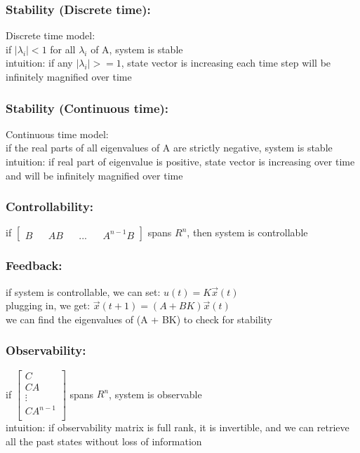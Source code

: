 \documentclass{beamer}
\begin{document}
\begin{frame}
\frametitle{Stability (Discrete time):}

Discrete time model: \\
if $|\lambda_{i}| < 1$ for all $\lambda_{i}$ of A, system is stable\\
intuition: if any $|\lambda_{i}| >= 1$, state vector is increasing each time step will be infinitely magnified over time \\
\end{frame}

\begin{frame}
\frametitle{Stability (Continuous time):}

Continuous time model: \\
if the real parts of all eigenvalues of A are strictly negative, system is stable\\
intuition: if real part of eigenvalue is positive, state vector is increasing over time and will be infinitely magnified over time \\
\end{frame}

\begin{frame}
\frametitle{Controllability:}

if
$\begin{bmatrix}
B && AB && ... && A^{n-1}B
\end{bmatrix}$
spans $R^{n}$, then system is controllable 
\end{frame}

\begin{frame}
\frametitle{Feedback:}

if system is controllable, we can set: 
$u(t) = K\vec{x}(t)$ \\
plugging in, we get: 
$\vec{x}(t+1) = (A + BK)\vec{x}(t)$ \\
we can find the eigenvalues of (A + BK) to check for stability
\end{frame}

\begin{frame}
\frametitle{Observability:} 

if 
$\begin{bmatrix}
C \\
CA \\
\vdots \\
CA^{n-1} \\
\end{bmatrix}$
spans $R^{n}$, system is observable \\
intuition: if observability matrix is full rank, it is invertible, and we can retrieve all the past states without loss of information \\
\end{frame}
\end{document}
